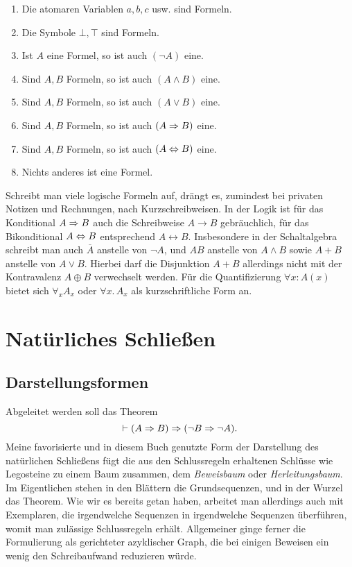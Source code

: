 \begin{enumerate}\setlength\itemsep{0em}
\item Die atomaren Variablen $a,b,c$ usw. sind Formeln.
\item Die Symbole $\bot,\top$ sind Formeln.
\item Ist $A$ eine Formel, so ist auch $(\lnot A)$ eine.
\item Sind $A,B$ Formeln, so ist auch $(A\land B)$ eine.
\item Sind $A,B$ Formeln, so ist auch $(A\lor B)$ eine.
\item Sind $A,B$ Formeln, so ist auch $(A\Rightarrow B)$ eine.
\item Sind $A,B$ Formeln, so ist auch $(A\Leftrightarrow B)$ eine.
\item Nichts anderes ist eine Formel.
\end{enumerate}

\noindent
Schreibt man viele logische Formeln auf, drängt es, zumindest bei privaten
Notizen und Rechnungen, nach Kurzschreibweisen. In der Logik ist für das
Konditional $A\Rightarrow B$ auch die Schreibweise $A\rightarrow B$ gebräuchlich,
für das Bikonditional $A\Leftrightarrow B$ entsprechend $A\leftrightarrow B$.
Insbesondere in der Schaltalgebra schreibt man auch $\overline A$
anstelle von $\lnot A$, und $AB$ anstelle von $A\land B$ sowie $A+B$
anstelle von $A\lor B$. Hierbei darf die Disjunktion $A+B$ allerdings
nicht mit der Kontravalenz $A\oplus B$ verwechselt werden. Für die
Quantifizierung $\forall x\colon A(x)$ bietet sich $\forall_x A_x$ oder
$\forall x.\, A_x$ als kurzschriftliche Form an.

\newpage
\section{Natürliches Schließen}

\subsection{Darstellungsformen}

Abgeleitet werden soll das Theorem
\[\vdash (A\Rightarrow B)\Rightarrow (\lnot B\Rightarrow\lnot A).\]
Meine favorisierte und in diesem Buch genutzte Form der Darstellung
des natürlichen Schließens fügt die aus den Schlussregeln erhaltenen
Schlüsse wie Legosteine zu einem Baum zusammen, dem
\emph{Beweisbaum} oder \emph{Herleitungsbaum}.
Im Eigentlichen stehen in den Blättern die Grundsequenzen, und in der
Wurzel das Theorem. Wie wir es bereits getan haben, arbeitet man
allerdings auch mit Exemplaren, die irgendwelche Sequenzen in
irgendwelche Sequenzen überführen, womit man zulässige Schlussregeln
erhält. Allgemeiner ginge ferner die Formulierung als gerichteter
azyklischer Graph, die bei einigen Beweisen ein wenig den
Schreibaufwand reduzieren würde.

